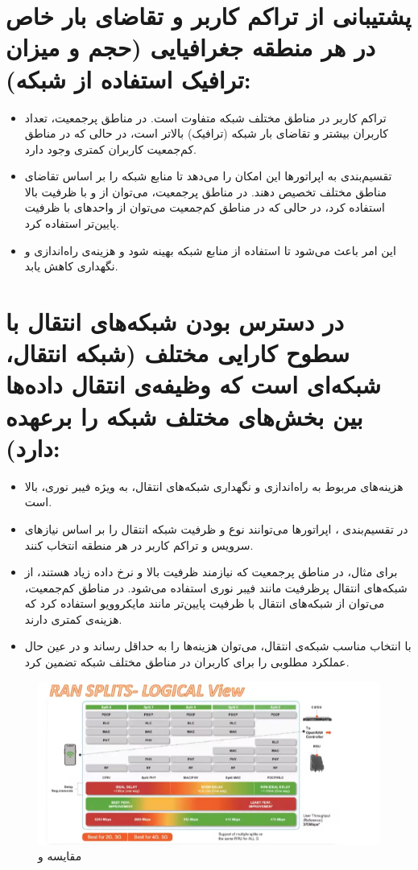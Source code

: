 \documentclass[landscape, 12pt]{report}
\begin{document}
\section*{پشتیبانی از تراکم کاربر و تقاضای بار خاص در هر منطقه جغرافیایی (حجم و میزان ترافیک استفاده از شبکه):}

\begin{itemize}
    \item تراکم کاربر در مناطق مختلف شبکه متفاوت است. در مناطق پرجمعیت، تعداد کاربران بیشتر و تقاضای بار شبکه (ترافیک) بالاتر است، در حالی که در مناطق کم‌جمعیت کاربران کمتری وجود دارد.
    \item تقسیم‌بندی  به اپراتورها این امکان را می‌دهد تا منابع شبکه را بر اساس تقاضای مناطق مختلف تخصیص دهند. در مناطق پرجمعیت، می‌توان از  و  با ظرفیت بالا استفاده کرد، در حالی که در مناطق کم‌جمعیت می‌توان از واحدهای با ظرفیت پایین‌تر استفاده کرد.
    \item این امر باعث می‌شود تا استفاده از منابع شبکه بهینه شود و هزینه‌ی راه‌اندازی و نگهداری کاهش یابد.
\end{itemize}

\section*{در دسترس بودن شبکه‌های انتقال با سطوح کارایی مختلف (شبکه انتقال، شبکه‌ای است که وظیفه‌ی انتقال داده‌ها بین بخش‌های مختلف شبکه را برعهده دارد):}

\begin{itemize}
    \item هزینه‌های مربوط به راه‌اندازی و نگهداری شبکه‌های انتقال، به ویژه فیبر نوری، بالا است.
    \item در تقسیم‌بندی ، اپراتورها می‌توانند نوع و ظرفیت شبکه انتقال را بر اساس نیازهای سرویس و تراکم کاربر در هر منطقه انتخاب کنند.
    \item برای مثال، در مناطق پرجمعیت که نیازمند ظرفیت بالا و نرخ داده زیاد هستند، از شبکه‌های انتقال پرظرفیت مانند فیبر نوری استفاده می‌شود. در مناطق کم‌جمعیت، می‌توان از شبکه‌های انتقال با ظرفیت پایین‌تر مانند مایکروویو استفاده کرد که هزینه‌ی کمتری دارند.
    \item با انتخاب مناسب شبکه‌ی انتقال، می‌توان هزینه‌ها را به حداقل رساند و در عین حال عملکرد مطلوبی را برای کاربران در مناطق مختلف شبکه تضمین کرد.
\end{itemize}

\begin{figure}[ht]
	\centering
	\includegraphics[width=.6\linewidth]{Pic/RAN}
	\caption{  مقایسه  و 
	}
	\label{fig:Fronthaul_Midhaul_Backhaul}
\end{figure}
\end{document}
